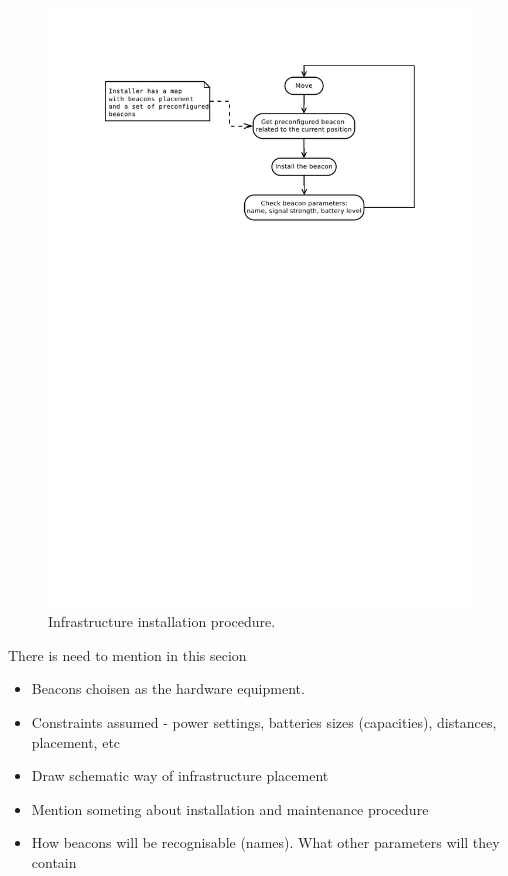 \documentclass[../main.tex]{subfiles}
\begin{document}
\begin{figure}[ht]
\includegraphics[width=\textwidth, trim={0 18cm 0 0},clip]{pictures/infrastructure_installation_proc.pdf}
\centering
\caption{Infrastructure installation procedure.}
\label{fig:infrastructure_installation_proc}
\end{figure}

There is need to mention in this secion
\begin{itemize}
	\item Beacons choisen as the hardware equipment.
	\item Constraints assumed - power settings, batteries sizes (capacities), distances, placement, etc
	\item Draw schematic way of infrastructure placement
	\item Mention someting about installation and maintenance procedure
	\item How beacons will be recognisable (names). What other parameters will they contain
\end{itemize}
\end{document}
